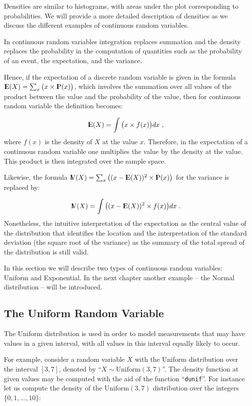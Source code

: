 \documentclass[]{krantz}
\newcommand{\Expec}{{\rm I\kern-.3em E}}
\newcommand{\Prob}{{\rm I\kern-.3em P}}
\newcommand{\Var}{{\rm I\kern-.3em V}}
\theoremstyle{definition}
\theoremstyle{definition}
\theoremstyle{definition}
\theoremstyle{remark}
\begin{document}
Densities are similar to histograms, with areas under the plot
corresponding to probabilities. We will provide a more detailed
description of densities as we discuss the different examples of
continuous random variables.

In continuous random variables integration replaces summation and the
density replaces the probability in the computation of quantities such
as the probability of an event, the expectation, and the variance.

Hence, if the expectation of a discrete random variable is given in the
formula \(\Expec(X) = \sum_x \big(x \times \Prob(x)\big)\), which involves
the summation over all values of the product between the value and the
probability of the value, then for continuous random variable the
definition becomes:

\[\Expec(X) = \int \big(x \times f(x)\big)dx\;,\]
where \(f(x)\) is the density of \(X\) at the value \(x\). Therefore, in the
expectation of a continuous random variable one multiplies the value by
the density at the value. This product is then integrated over the
sample space.

Likewise, the formula
\(\Var(X) = \sum_x\big( (x-\Expec(X))^2 \times \Prob(x)\big)\) for the
variance is replaced by:

\[\Var(X) =\int\big((x-\Expec(X))^2 \times f(x) \big) dx\;.\]
Nonetheless, the intuitive interpretation of the expectation as the
central value of the distribution that identifies the location and the
interpretation of the standard deviation (the square root of the
variance) as the summary of the total spread of the distribution is
still valid.

In this section we will describe two types of continuous random
variables: Uniform and Exponential. In the next chapter another example
-- the Normal distribution -- will be introduced.

\hypertarget{the-uniform-random-variable}{%
\subsection{The Uniform Random Variable}\label{the-uniform-random-variable}}

The Uniform distribution is used in order to model measurements that may
have values in a given interval, with all values in this interval
equally likely to occur.

For example, consider a random variable \(X\) with the Uniform
distribution over the interval \([3,7]\), denoted by
``\(X \sim \mathrm{Uniform}(3,7)\)''. The density function at given values
may be computed with the aid of the function ``\texttt{dunif}''. For instance let
us compute the density of the \(\mathrm{Uniform}(3,7)\) distribution over
the integers \(\{0, 1, \ldots, 10\}\):
\end{document}
